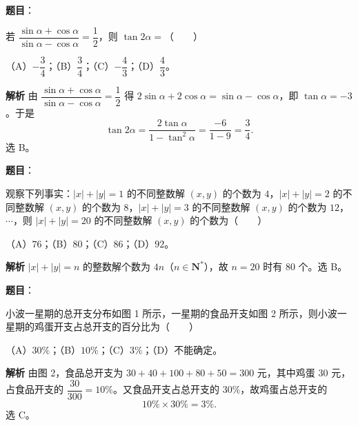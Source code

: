 \begin{answer}

\textbf{题目}：

若 $\dfrac{\sin\alpha+\cos\alpha}{\sin\alpha-\cos\alpha}=\dfrac12$，则 $\tan2\alpha=$\mbox{（　　）}

（A）$-\dfrac34$；（B）$\dfrac34$；（C）$-\dfrac43$；（D）$\dfrac43$。

\textbf{解析}
由 $\dfrac{\sin\alpha+\cos\alpha}{\sin\alpha-\cos\alpha}=\dfrac12$ 得 $2\sin\alpha+2\cos\alpha=\sin\alpha-\cos\alpha$，即 $\tan\alpha=-3$。于是
\nopagebreak[4]
\[\tan2\alpha=\frac{2\tan\alpha}{1-\tan^2\alpha}=\frac{-6}{1-9}=\frac34.\]
选 B。


\end{answer}
\begin{answer}

\textbf{题目}：

观察下列事实：$|x|+|y|=1$ 的不同整数解 $(x,y)$ 的个数为 $4$，$|x|+|y|=2$ 的不同整数解 $(x,y)$ 的个数为 $8$，$|x|+|y|=3$ 的不同整数解 $(x,y)$ 的个数为 $12$，$\cdots$，则 $|x|+|y|=20$ 的不同整数解 $(x,y)$ 的个数为\mbox{（　　）}

（A）$76$；（B）$80$；（C）$86$；（D）$92$。

\textbf{解析}
$|x|+|y|=n$ 的整数解个数为 $4n$（$n\in\mathbf N^*$），故 $n=20$ 时有 $80$ 个。选 B。


\end{answer}
\begin{answer}

\textbf{题目}：

小波一星期的总开支分布如图 1 所示，一星期的食品开支如图 2 所示，则小波一星期的鸡蛋开支占总开支的百分比为\mbox{（　　）}
\nopagebreak[4]
\begin{center}\end{center}
\nopagebreak[4]
（A）$30\%$；（B）$10\%$；（C）$3\%$；（D）不能确定。

\textbf{解析}
由图 2，食品总开支为 $30+40+100+80+50=300$ 元，其中鸡蛋 $30$ 元，占食品开支的 $\dfrac{30}{300}=10\%$。又食品开支占总开支的 $30\%$，故鸡蛋占总开支的
\nopagebreak[4]
\[10\%\times30\%=3\%.\]
选 C。


\end{answer}
